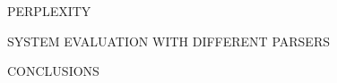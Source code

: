 \begin{frame}{PERPLEXITY}
    
\end{frame}

\begin{frame}{SYSTEM EVALUATION WITH DIFFERENT PARSERS}
    
\end{frame}

\begin{frame}{CONCLUSIONS}
    
\end{frame}







